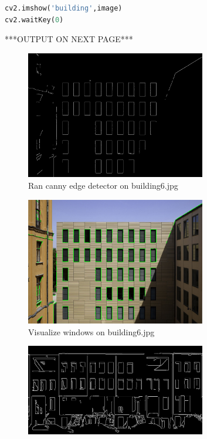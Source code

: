 \documentclass{csc_assignment4}
\begin{document}
\begin{description}
\begin{lstlisting}[language=Python]
cv2.imshow('building',image)
cv2.waitKey(0)
\end{lstlisting}
***OUTPUT ON NEXT PAGE***
\newpage
\begin{figure}
\includegraphics[width=0.7\textwidth, center]{building_6_canny.jpg}
\caption{Ran canny edge detector on building\textunderscore6.jpg}
\end{figure}
\begin{figure}
\includegraphics[width=0.7\textwidth, center]{building_6_windows.jpg}
\vspace{-5mm}
\caption{Visualize windows on building\textunderscore6.jpg}
\end{figure}
\begin{figure}
\vspace{-20mm}
\includegraphics[width=0.7\textwidth, center]{building_3_canny.jpg}

\end{figure}
\end{description}
\end{document}
